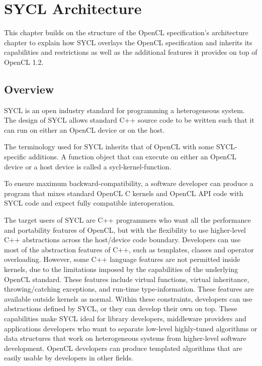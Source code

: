 %


\chapter{SYCL Architecture}

This chapter builds on the structure of the OpenCL specification's architecture
chapter to explain how SYCL overlays the OpenCL specification and inherits its
capabilities and restrictions as well as the additional features it provides on
top of OpenCL 1.2.

\section{Overview}

SYCL is an open industry standard for programming a heterogeneous system. The
design of SYCL allows standard C++ source code to be written such that it can
run on either an OpenCL device or on the \gls{host}.

The terminology used for SYCL inherits that of OpenCL with some
SYCL-specific additions. A function object that can execute on either
an OpenCL \gls{device} or a \gls{host} \gls{device} is called a
\gls{sycl-kernel-function}.

To ensure maximum backward-compatibility, a software developer can produce
a program that mixes standard OpenCL C kernels and OpenCL API code with
SYCL code and expect fully compatible interoperation.

The target users of SYCL are C++ programmers who want all the performance and
portability features of OpenCL, but with the flexibility to use higher-level C++
abstractions across the host/device code boundary. Developers can use most of
the abstraction features of C++, such as templates, classes and operator
overloading. However, some C++ language features are not permitted inside
kernels, due to the limitations imposed by the capabilities of the underlying
OpenCL standard. These features include virtual functions, virtual inheritance,
throwing/catching exceptions, and run-time type-information. These features are
available outside kernels as normal. Within these constraints, developers can
use abstractions defined by SYCL, or they can develop their own on top. These
capabilities make SYCL ideal for library developers, middleware providers and
applications developers who want to separate low-level highly-tuned algorithms
or data structures that work on heterogeneous systems from higher-level software
development. OpenCL developers can produce templated algorithms that are easily
usable by developers in other fields.

